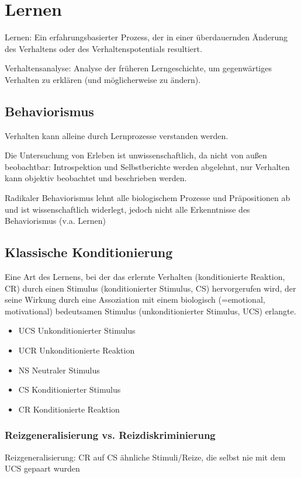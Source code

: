 \section{Lernen}
Lernen: Ein erfahrungsbasierter Prozess, der in einer überdauernden Änderung des Verhaltens oder des Verhaltenspotentials resultiert.

Verhaltensanalyse: Analyse der früheren Lerngeschichte, um gegenwärtiges Verhalten zu erklären (und möglicherweise zu ändern).

\subsection{Behaviorismus}
Verhalten kann alleine durch Lernprozesse verstanden werden.

Die Untersuchung von Erleben ist unwissenschaftlich, da nicht von außen beobachtbar: Introspektion und Selbstberichte werden abgelehnt, nur Verhalten kann objektiv beobachtet und beschrieben werden.

Radikaler Behaviorismus lehnt alle biologischem Prozesse und Präpositionen ab und ist wissenschaftlich widerlegt, jedoch nicht alle Erkenntnisse des Behaviorismus (v.a. Lernen) 

\subsection{Klassische Konditionierung}
Eine Art des Lernens, bei der das erlernte Verhalten (konditionierte Reaktion, CR) durch einen Stimulus (konditionierter Stimulus, CS) hervorgerufen wird, der seine Wirkung durch eine Assoziation mit einem biologisch (=emotional, motivational) bedeutsamen Stimulus (unkonditionierter Stimulus, UCS) erlangte.

\begin{itemize}
	\item UCS \rightarrow Unkonditionierter Stimulus
	\item UCR \rightarrow Unkonditionierte Reaktion
	\item NS \rightarrow Neutraler Stimulus
	\item CS \rightarrow Konditionierter Stimulus
	\item CR \rightarrow Konditionierte Reaktion
\end{itemize}

\subsubsection{Reizgeneralisierung vs. Reizdiskriminierung}
Reizgeneralisierung: CR auf CS ähnliche Stimuli/Reize, die selbst nie mit dem UCS gepaart wurden


